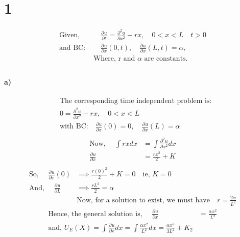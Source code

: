 \documentclass[letterpaper,12pt,titlepage,oneside,final]{book}
\newcommand*{\pd}[3][]{\ensuremath{\frac{\partial^{#1} #2}{\partial #3}}}
\begin{document}



\section*{1}
\begin{align*}
\text{Given, }&\quad \pd{u}{t}=\pd[2]{u}{x^2} - rx, \quad 0<x<L \quad t>0\\
\text{and BC: }&\quad \pd{u}{x}(0,t), \quad \pd{u}{x}(L,t) = \alpha, \\
&\text{Where, r and $\alpha$  are constants.}\\
\end{align*}

\paragraph{a)}
\begin{align*}
&\text{The corresponding time independent problem is:}\\
&0 = \pd[2]{u}{x^2} - rx, \quad 0<x<L\\
&\text{with BC:}\quad \pd{u}{x}(0) = 0, \quad \pd{u}{x}(L) = \alpha\\
\end{align*}
\begin{align*}
\text{Now, }\quad \int rx dx &= \int\pd[2]{u}{x^2} dx\\
\pd{u}{x} &= \frac{rx^2}{2} + K\\
\end{align*}
\begin{align*}
\text{So, }\quad \pd{u}{x}(0) &\implies \frac{r(0)^2}{2} +K = 0\quad\text{ie, }K=0\\
\text{And, }\quad \pd{u}{L} &\implies \frac{rL^2}{2}  = \alpha\\
&\text{Now, for a solution to exist, we must have}\quad r = \frac{2\alpha}{L^2} 
\end{align*}
\begin{align*}
\text{Hence, the general solution is, }\quad \pd{u}{x} &= \frac{\alpha x^2}{L^2}\\
\text{and, } U_E(X) = \int\pd{u}{x} dx =\int\frac{\alpha x^2}{L^2} dx= \frac{\alpha x^3}{3L^2} +K_2
\end{align*}
\end{document}
